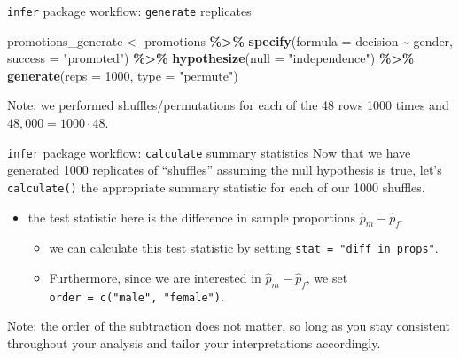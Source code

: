 \documentclass[
  ignorenonframetext,
]{beamer}
\newenvironment{Shaded}{\begin{snugshade}}{\end{snugshade}}
\newcommand{\AttributeTok}[1]{\textcolor[rgb]{0.13,0.29,0.53}{#1}}
\newcommand{\DecValTok}[1]{\textcolor[rgb]{0.00,0.00,0.81}{#1}}
\newcommand{\FunctionTok}[1]{\textcolor[rgb]{0.13,0.29,0.53}{\textbf{#1}}}
\newcommand{\NormalTok}[1]{#1}
\newcommand{\OtherTok}[1]{\textcolor[rgb]{0.56,0.35,0.01}{#1}}
\newcommand{\SpecialCharTok}[1]{\textcolor[rgb]{0.81,0.36,0.00}{\textbf{#1}}}
\newcommand{\StringTok}[1]{\textcolor[rgb]{0.31,0.60,0.02}{#1}}
\providecommand{\tightlist}{%
  \setlength{\itemsep}{0pt}\setlength{\parskip}{0pt}}
\begin{document}
\begin{frame}[fragile]{\texttt{infer} package workflow:
\texttt{generate} replicates}
\protect\hypertarget{infer-package-workflow-generate-replicates-1}{}
\begin{Shaded}
\begin{Highlighting}[]
\NormalTok{promotions\_generate }\OtherTok{\textless{}{-}}\NormalTok{ promotions }\SpecialCharTok{\%\textgreater{}\%} 
  \FunctionTok{specify}\NormalTok{(}\AttributeTok{formula =}\NormalTok{ decision }\SpecialCharTok{\textasciitilde{}}\NormalTok{ gender, }
          \AttributeTok{success =} \StringTok{"promoted"}\NormalTok{) }\SpecialCharTok{\%\textgreater{}\%} 
  \FunctionTok{hypothesize}\NormalTok{(}\AttributeTok{null =} \StringTok{"independence"}\NormalTok{) }\SpecialCharTok{\%\textgreater{}\%} 
  \FunctionTok{generate}\NormalTok{(}\AttributeTok{reps =} \DecValTok{1000}\NormalTok{, }\AttributeTok{type =} \StringTok{"permute"}\NormalTok{)}
\end{Highlighting}
\end{Shaded}

Note: we performed shuffles/permutations for each of the 48 rows 1000
times and \(48,000=1000\cdot 48\).
\end{frame}

\begin{frame}[fragile]{\texttt{infer} package workflow:
\texttt{calculate} summary statistics}
\protect\hypertarget{infer-package-workflow-calculate-summary-statistics}{}
Now that we have generated 1000 replicates of ``shuffles'' assuming the
null hypothesis is true, let's \texttt{calculate()} the appropriate
summary statistic for each of our 1000 shuffles.

\begin{itemize}
\item
  the test statistic here is the difference in sample proportions
  \(\hat{p}_m-\hat{p}_f\).

  \begin{itemize}
  \tightlist
  \item
    we can calculate this test statistic by setting
    \texttt{stat\ =\ "diff\ in\ props"}.
  \item
    Furthermore, since we are interested in \(\hat{p}_m-\hat{p}_f\), we
    set \texttt{order\ =\ c("male",\ "female")}.
  \end{itemize}
\end{itemize}

Note: the order of the subtraction does not matter, so long as you stay
consistent throughout your analysis and tailor your interpretations
accordingly.
\end{frame}
\end{document}
